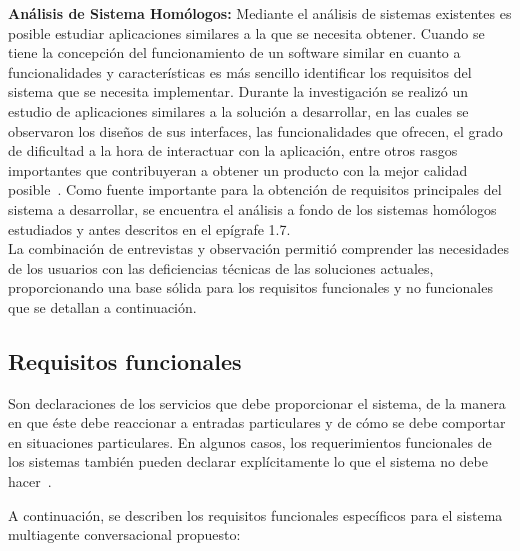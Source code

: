 \textbf{Análisis de Sistema Homólogos:} Mediante el análisis de sistemas existentes es
posible estudiar aplicaciones similares a la que se necesita obtener. Cuando se tiene
la concepción del funcionamiento de un software similar en cuanto a funcionalidades
y características es más sencillo identificar los requisitos del sistema que se necesita
implementar. Durante la investigación se realizó un estudio de aplicaciones similares
a la solución a desarrollar, en las cuales se observaron los diseños de sus interfaces,
las funcionalidades que ofrecen, el grado de dificultad a la hora de interactuar con
la aplicación, entre otros rasgos importantes que contribuyeran a obtener un
producto con la mejor calidad posible~\cite{sommerville2011software}. Como fuente importante
para la obtención de requisitos principales del sistema a desarrollar, se encuentra el
análisis a fondo de los sistemas homólogos estudiados y antes descritos en el
epígrafe 1.7.\\
La combinación de entrevistas y observación permitió comprender las necesidades de los usuarios con las deficiencias técnicas de las soluciones actuales, proporcionando una base sólida para los requisitos funcionales y no funcionales que se detallan a continuación.



\subsection{Requisitos funcionales}

Son declaraciones de los servicios que debe proporcionar el sistema, de la manera en que
éste debe reaccionar a entradas particulares y de cómo se debe comportar en situaciones
particulares. En algunos casos, los requerimientos funcionales de los sistemas también
pueden declarar explícitamente lo que el sistema no debe hacer~\cite{sommerville2011software}.

A continuación, se describen los requisitos funcionales específicos para el sistema multiagente conversacional propuesto:

